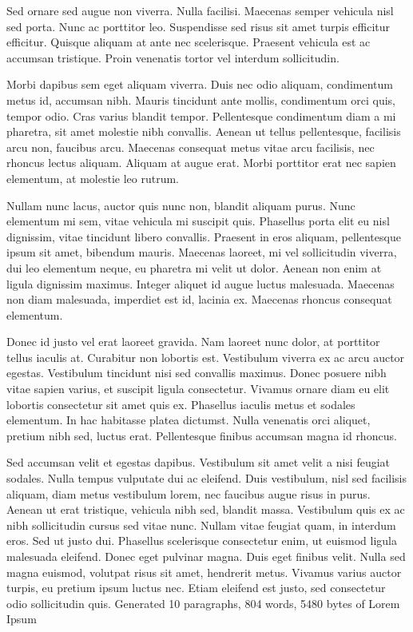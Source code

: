 Sed ornare sed augue non viverra. Nulla facilisi. Maecenas semper vehicula nisl sed porta. Nunc ac porttitor leo. Suspendisse sed risus sit amet turpis efficitur efficitur. Quisque aliquam at ante nec scelerisque. Praesent vehicula est ac accumsan tristique. Proin venenatis tortor vel interdum sollicitudin.

Morbi dapibus sem eget aliquam viverra. Duis nec odio aliquam, condimentum metus id, accumsan nibh. Mauris tincidunt ante mollis, condimentum orci quis, tempor odio. Cras varius blandit tempor. Pellentesque condimentum diam a mi pharetra, sit amet molestie nibh convallis. Aenean ut tellus pellentesque, facilisis arcu non, faucibus arcu. Maecenas consequat metus vitae arcu facilisis, nec rhoncus lectus aliquam. Aliquam at augue erat. Morbi porttitor erat nec sapien elementum, at molestie leo rutrum.

Nullam nunc lacus, auctor quis nunc non, blandit aliquam purus. Nunc elementum mi sem, vitae vehicula mi suscipit quis. Phasellus porta elit eu nisl dignissim, vitae tincidunt libero convallis. Praesent in eros aliquam, pellentesque ipsum sit amet, bibendum mauris. Maecenas laoreet, mi vel sollicitudin viverra, dui leo elementum neque, eu pharetra mi velit ut dolor. Aenean non enim at ligula dignissim maximus. Integer aliquet id augue luctus malesuada. Maecenas non diam malesuada, imperdiet est id, lacinia ex. Maecenas rhoncus consequat elementum.

Donec id justo vel erat laoreet gravida. Nam laoreet nunc dolor, at porttitor tellus iaculis at. Curabitur non lobortis est. Vestibulum viverra ex ac arcu auctor egestas. Vestibulum tincidunt nisi sed convallis maximus. Donec posuere nibh vitae sapien varius, et suscipit ligula consectetur. Vivamus ornare diam eu elit lobortis consectetur sit amet quis ex. Phasellus iaculis metus et sodales elementum. In hac habitasse platea dictumst. Nulla venenatis orci aliquet, pretium nibh sed, luctus erat. Pellentesque finibus accumsan magna id rhoncus.

Sed accumsan velit et egestas dapibus. Vestibulum sit amet velit a nisi feugiat sodales. Nulla tempus vulputate dui ac eleifend. Duis vestibulum, nisl sed facilisis aliquam, diam metus vestibulum lorem, nec faucibus augue risus in purus. Aenean ut erat tristique, vehicula nibh sed, blandit massa. Vestibulum quis ex ac nibh sollicitudin cursus sed vitae nunc. Nullam vitae feugiat quam, in interdum eros. Sed ut justo dui. Phasellus scelerisque consectetur enim, ut euismod ligula malesuada eleifend. Donec eget pulvinar magna. Duis eget finibus velit. Nulla sed magna euismod, volutpat risus sit amet, hendrerit metus. Vivamus varius auctor turpis, eu pretium ipsum luctus nec. Etiam eleifend est justo, sed consectetur odio sollicitudin quis.
Generated 10 paragraphs, 804 words, 5480 bytes of Lorem Ipsum
